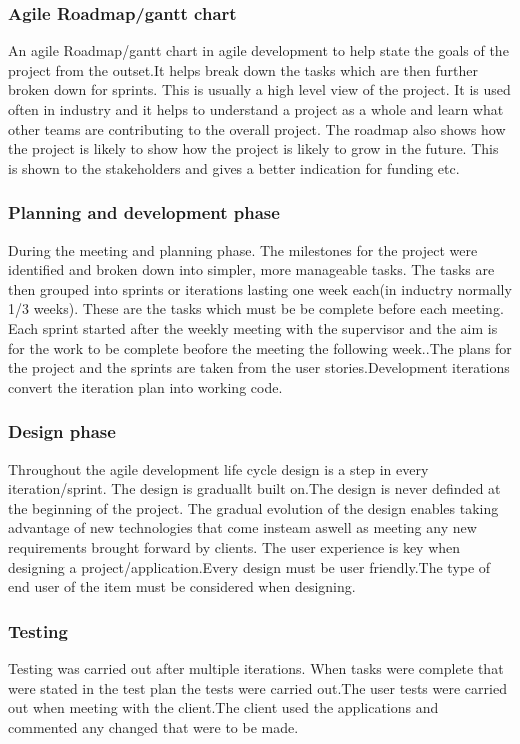 \subsubsection{Agile Roadmap/gantt chart}
An agile Roadmap/gantt chart in agile development to help state the goals of the project from the outset.It helps break down the tasks which are then further broken down for sprints. This is usually a high level view of the project.\cite{testPlan} It is used often in industry and it helps to understand a project as a whole and learn what other teams are contributing to the overall project. The roadmap also shows how the project is likely to show how the project is likely to grow in the future. This is shown to the stakeholders and gives a better indication for funding etc.\cite{roadmap_2016}

\subsubsection{Planning and development phase}
During the meeting and planning phase. The milestones for the project were identified and broken down into simpler, more manageable tasks. The tasks are then grouped into sprints or iterations lasting one week each(in inductry normally 1/3 weeks). These are the tasks which must be be complete before each meeting. Each sprint started after the weekly meeting with the supervisor and the aim is for the work to be complete beofore the meeting the following week.\cite{Agile}.The plans for the project and the sprints are taken from the user stories.Development iterations convert the iteration plan into working code.\cite{agile_process}

\subsubsection{Design phase}
Throughout the agile development life cycle design is a step in every iteration/sprint. The design is graduallt built on.The design is never definded at the beginning of the project. The gradual evolution of the design enables taking advantage of new technologies that come insteam aswell as meeting any new requirements brought forward by clients. The user experience is key when designing a project/application.Every design must be user friendly.The type of end user of the item must be considered when designing.

\subsubsection{Testing}
Testing was carried out after multiple iterations. When tasks were complete that were stated in the test plan the tests were carried out.The user tests were carried out when meeting with the client.The client used the applications and commented any changed that were to be made.



